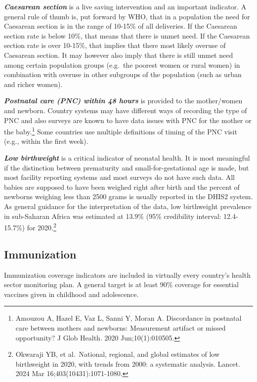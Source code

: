 \documentclass[
  english,
  letterpaper,
  DIV=11,
  numbers=noendperiod]{scrreprt}
\begin{document}
\textbf{\emph{Caesarean section}} is a live saving intervention and an
important indicator. A general rule of thumb is, put forward by WHO,
that in a population the need for Caesarean section is in the range of
10-15\% of all deliveries. If the Caesarean section rate is below 10\%,
that means that there is unmet need. If the Caesarean section rate is
over 10-15\%, that implies that there most likely overuse of Caesarean
section. It may however also imply that there is still unmet need among
certain population groups (e.g.~the poorest women or rural women) in
combination with overuse in other subgroups of the population (such as
urban and richer women).

\textbf{\emph{Postnatal care (PNC) within 48 hours}} is provided to the
mother/women and newborn. Country systems may have different ways of
recording the type of PNC and also surveys are known to have data issues
with PNC for the mother or the baby.\footnote{Amouzou A, Hazel E, Vaz L,
  Sanni Y, Moran A. Discordance in postnatal care between mothers and
  newborns: Measurement artifact or missed opportunity? J Glob Health.
  2020 Jun;10(1):010505.} Some countries use multiple definitions of
timing of the PNC visit (e.g., within the first week).

\textbf{\emph{Low birthweight}} is a critical indicator of neonatal
health. It is most meaningful if the distinction between prematurity and
small-for-gestational age is made, but most facility reporting systems
and most surveys do not have such data. All babies are supposed to have
been weighed right after birth and the percent of newborns weighing less
than 2500 grams is usually reported in the DHIS2 system. As general
guidance for the interpretation of the data, low birthweight prevalence
in sub-Saharan Africa was estimated at 13.9\% (95\% credibility
interval: 12.4-15.7\%) for 2020.\footnote{Okwaraji YB, et al.~National,
  regional, and global estimates of low birthweight in 2020, with trends
  from 2000: a systematic analysis. Lancet. 2024 Mar
  16;403(10431):1071-1080.}

\subsection{Immunization}\label{sec-nat-cov-immunization}

Immunization coverage indicators are included in virtually every
country's health sector monitoring plan. A general target is at least
90\% coverage for essential vaccines given in childhood and adolescence.
\end{document}
